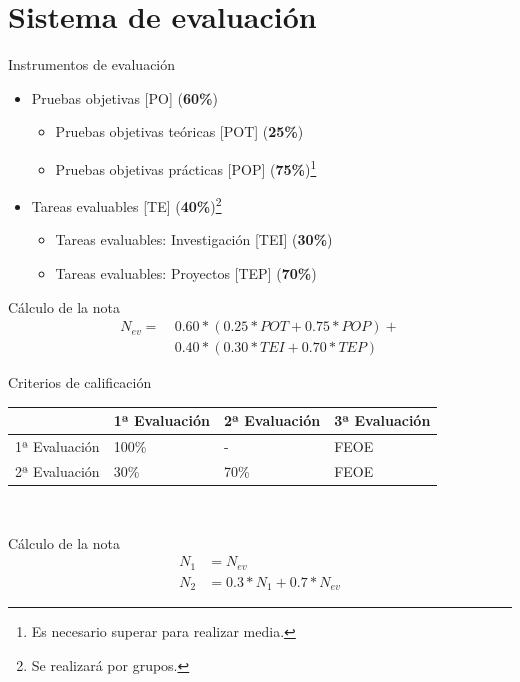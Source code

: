 \documentclass{beamer}
\begin{document}
\section{Sistema de evaluación}
\begin{frame}{Instrumentos de evaluación}
    \begin{itemize}
        \item Pruebas objetivas [PO] (\textbf{60\%})
        \begin{itemize}
            \item Pruebas objetivas teóricas [POT] (\textbf{25\%})
            \item Pruebas objetivas prácticas [POP] (\textbf{75\%})\footnote{Es necesario superar para realizar media.}
        \end{itemize}
        \item Tareas evaluables [TE] (\textbf{40\%})\footnote{Se realizará por grupos.}
        \begin{itemize}
            \item Tareas evaluables: Investigación [TEI] (\textbf{30\%})
            \item Tareas evaluables: Proyectos [TEP] (\textbf{70\%})
        \end{itemize}
    \end{itemize}


    \begin{block}{\tiny{Cálculo de la nota}}
        \vspace{-2em}
        \begin{align*}
        N_{ev} =\ & 0.60 * (0.25 * POT + 0.75 * POP) +\\
                & 0.40 * (0.30 * TEI + 0.70 * TEP)
        \end{align*}
        \vspace{-2em}
    \end{block}

\end{frame}

\begin{frame}{Criterios de calificación}
    \begin{tabular}{|l|l|l|l|}
        \hline
        & 1ª Evaluación & 2ª Evaluación & 3ª Evaluación\\
        \hline
        1ª Evaluación & 100\% & - & FEOE\\
        \hline
        2ª Evaluación & 30\%  & 70\% & FEOE\\
        \hline
    \end{tabular}\\[1em]

    \begin{block}{\tiny{Cálculo de la nota}}
        \vspace{-1.5em}
        \begin{align*}
            N_1 &= N_{ev}\\
            N_2 &= 0.3 * N_1 + 0.7 * N_{ev}
        \end{align*}
    \end{block}
\end{frame}
\end{document}
